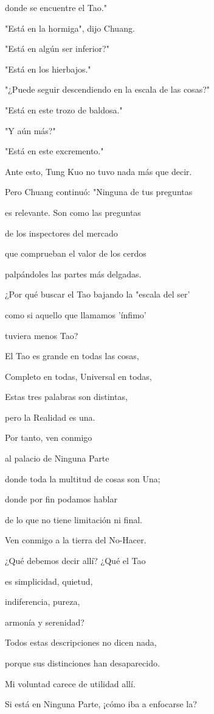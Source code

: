 donde se encuentre el Tao."

"Está en la hormiga", dijo Chuang.

"Está en algún ser inferior?"

"Está en los hierbajos."

"¿Puede seguir descendiendo en la escala de las cosas?"

"Está en este trozo de baldosa."

"Y aún más?"

"Está en este excremento."

Ante esto, Tung Kuo no tuvo nada más que decir.

Pero Chuang continuó: "Ninguna de tus preguntas

es relevante. Son como las preguntas

de los inspectores del mercado

que comprueban el valor de los cerdos

palpándoles las partes más delgadas.

¿Por qué buscar el Tao bajando la "escala del ser'

como si aquello que llamamos 'ínfimo'

tuviera menos Tao?

El Tao es grande en todas las cosas,

Completo en todas, Universal en todas,

Estas tres palabras son distintas,

pero la Realidad es una.

Por tanto, ven conmigo

al palacio de Ninguna Parte

donde toda la multitud de cosas son Una;

donde por fin podamos hablar

de lo que no tiene limitación ni final.

Ven conmigo a la tierra del No-Hacer.

¿Qué debemos decir allí? ¿Qué el Tao

es simplicidad, quietud,

indiferencia, pureza,

armonía y serenidad?

Todos estas descripciones no dicen nada,

porque sus distinciones han desaparecido.

Mi voluntad carece de utilidad allí.

Si está en Ninguna Parte, ¡cómo iba a enfocarse la?

